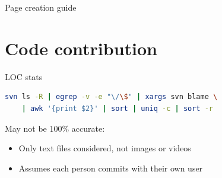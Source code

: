 \documentclass[10pt]{beamer}
\begin{document}
\begin{frame}{Page creation guide}
\vfill{}\vfill
\end{frame}

\section{Code contribution}

\begin{frame}[fragile]{LOC stats}
\begin{lstlisting}[language=bash]
svn ls -R | egrep -v -e "\/\$" | xargs svn blame \
    | awk '{print $2}' | sort | uniq -c | sort -r
\end{lstlisting}
\vfill
May not be 100\% accurate:
\begin{itemize}
\item Only text files considered, not images or videos
\item Assumes each person commits with their own user
\end{itemize}
\end{frame}
\end{document}
